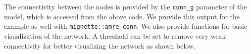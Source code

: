 \documentclass[
]{book}
\newenvironment{Shaded}{\begin{snugshade}}{\end{snugshade}}
\newcommand{\AttributeTok}[1]{\textcolor[rgb]{0.77,0.63,0.00}{#1}}
\newcommand{\ConstantTok}[1]{\textcolor[rgb]{0.00,0.00,0.00}{#1}}
\newcommand{\DecValTok}[1]{\textcolor[rgb]{0.00,0.00,0.81}{#1}}
\newcommand{\FunctionTok}[1]{\textcolor[rgb]{0.00,0.00,0.00}{#1}}
\newcommand{\NormalTok}[1]{#1}
\newcommand{\OtherTok}[1]{\textcolor[rgb]{0.56,0.35,0.01}{#1}}
\newcommand{\SpecialCharTok}[1]{\textcolor[rgb]{0.00,0.00,0.00}{#1}}
\newcommand{\StringTok}[1]{\textcolor[rgb]{0.31,0.60,0.02}{#1}}
\begin{document}
\begin{Shaded}
\end{Shaded}

The connectivity between the nodes is provided by the \texttt{conn\_g} parameter of the model, which is accessed from the above code. We provide this output for the example as well with \texttt{mignette::amre\_conn}. We also provide functions for basic visualization of the network. A threshold can be set to remove very weak connectivity for better visualizing the network as shown below.
\end{document}
